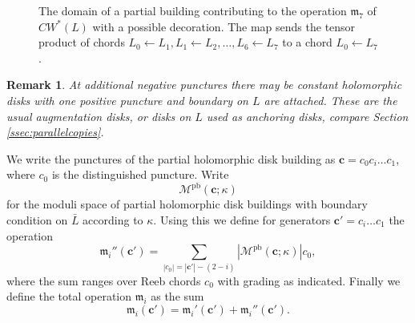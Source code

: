 \documentclass{gtpart}
\newtheorem{rem}[thm]{Remark}
\newcommand{\m}{\mathfrak{m}}
\newcommand{\pb}{\mathrm{pb}}
\begin{document}
\begin{figure}[h!]
    \caption{The domain of a partial building contributing to the operation $\m_7$ of $CW^*(L)$
    with a possible decoration. The map sends the tensor product of chords $L_0 \leftarrow L_1,
    L_1 \leftarrow L_2, \ldots, L_6 \leftarrow L_7$ to a chord $L_0 \leftarrow
    L_7$.} \label{partial}
\end{figure}

\begin{rem}
At additional negative punctures there may be constant holomorphic disks with one positive puncture and boundary on $L$ are attached. These are the usual augmentation disks, or disks on $L$ used as anchoring disks, compare Section \ref{ssec:parallelcopies}.   
\end{rem}
We write the punctures of the partial holomorphic disk building as $\mathbf{c}=c_{0}c_{i}\dots c_{1}$, where $c_{0}$ is the distinguished puncture. Write 
\[ 
\mathcal{M}^{\pb}(\mathbf{c};\kappa)
\]
for the moduli space of partial holomorphic disk buildings with boundary condition on $\bar L$ according to $\kappa$. Using this we define for generators $\mathbf{c}'=c_{i}\dots c_{1}$ the operation
\[ 
\m_{i}''(\mathbf{c}')=\sum_{|c_{0}|=|\mathbf{c}'|-(2-i)}|\mathcal{M}^{\pb}(\mathbf{c};\kappa)|c_{0},
\]
where the sum ranges over Reeb chords $c_{0}$ with grading as indicated. Finally we define the total operation $\m_{i}$ as the sum
\[ 
\m_{i}(\mathbf{c}')=\m_{i}'(\mathbf{c}') + \m_{i}''(\mathbf{c}').
\]
\end{document}
